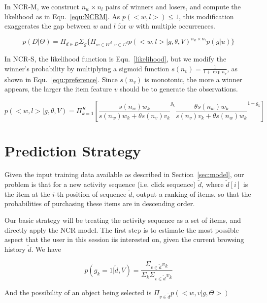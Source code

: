 \documentclass[sigconf]{acmart}
\begin{document}
In NCR-M, we construct $n_w \times n_l $ pairs of winners and losers, and compute the likelihood as in Equ.~\ref{equ:NCRM}. As $p(<w,l>) \leq 1$, this modification exaggerates the gap between $w$ and $l$ for $w$ with multiple occurrences. 

\begin{equation}\label{equ:NCRM}
		p(D|\Theta)=\Pi_{d\in D} \Sigma_{g} \{ \Pi_{w\in W^d, v\in L^d} {p(<w,l>|g,\theta,V)}^{n_w \times n_l} p(g|u) \}
\end{equation}

In NCR-S, the likelihood function is Equ.~\ref{likelihood}, but we modify the winner's probability by multiplying a sigmoid function $s(n_v)=\frac{1}{1+\exp n_v}$, as shown in Equ.~\ref{equ:preference}. Since $s(n_v)$ is monotonic, the more a winner appears, the larger the item feature $v$ should be to generate the observations. 

\begin{equation}\label{equ:peference}
 p(<w,l>|g,\theta,V)  =  \Pi_{k=1}^{K}[ {\frac{s(n_w) w_k}{s(n_w) w_k+\theta s(n_v) v_k}}^{g_k} { \frac{\theta s(n_w) w_{k}}{s(n_v) v_{k}+\theta s(n_w) w_{k}}}^{1-g_k}]
\end{equation}


\section{Prediction Strategy}\label{sec:strategy}

Given the input training data available as described in Section~\ref{sec:model}, our problem is that for a new activity sequence (i.e. click sequence) $\tilde{d}$,  where $\tilde{d}[i]$ is the item at the $i$-th position of sequence $\tilde{d}$,  output a ranking of items, so that the probabilities of purchasing these items are in descending order.
 
Our basic strategy will be treating the activity sequence as a set of items, and directly apply the NCR model. The first step is to estimate the most possible aspect that the user in this session iis interested on, given the current browsing history $\tilde{d}$. We have

\begin{equation}\label{aprobability}
p(g_k=1|\tilde{d},V)=\frac{\Sigma_{v\in \tilde{d}} v_k}{\Sigma_k \Sigma_{v\in \tilde{d}} v_k}
\end{equation}

And the possibility of an object being selected is $\Pi_{v \in \tilde{d}} p(<w, v|g,\Theta>)$ 
\end{document}
